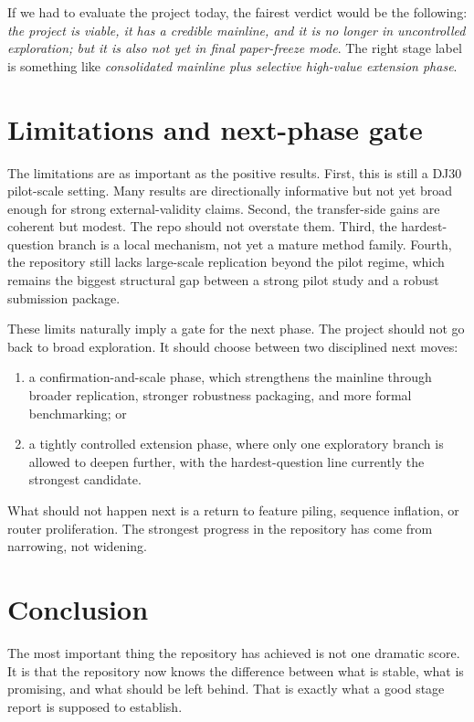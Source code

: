 \documentclass[acmsmall,screen,nonacm]{acmart}
\begin{document}
If we had to evaluate the project today, the fairest verdict would be the following: \emph{the project is viable, it has a credible mainline, and it is no longer in uncontrolled exploration; but it is also not yet in final paper-freeze mode}. The right stage label is something like \emph{consolidated mainline plus selective high-value extension phase}.

\section{Limitations and next-phase gate}
The limitations are as important as the positive results. First, this is still a DJ30 pilot-scale setting. Many results are directionally informative but not yet broad enough for strong external-validity claims. Second, the transfer-side gains are coherent but modest. The repo should not overstate them. Third, the hardest-question branch is a local mechanism, not yet a mature method family. Fourth, the repository still lacks large-scale replication beyond the pilot regime, which remains the biggest structural gap between a strong pilot study and a robust submission package.

These limits naturally imply a gate for the next phase. The project should not go back to broad exploration. It should choose between two disciplined next moves:
\begin{enumerate}[leftmargin=1.5em]
    \item a confirmation-and-scale phase, which strengthens the mainline through broader replication, stronger robustness packaging, and more formal benchmarking; or
    \item a tightly controlled extension phase, where only one exploratory branch is allowed to deepen further, with the hardest-question line currently the strongest candidate.
\end{enumerate}

What should not happen next is a return to feature piling, sequence inflation, or router proliferation. The strongest progress in the repository has come from narrowing, not widening.

\section{Conclusion}
The most important thing the repository has achieved is not one dramatic score. It is that the repository now knows the difference between what is stable, what is promising, and what should be left behind. That is exactly what a good stage report is supposed to establish.
\end{document}
